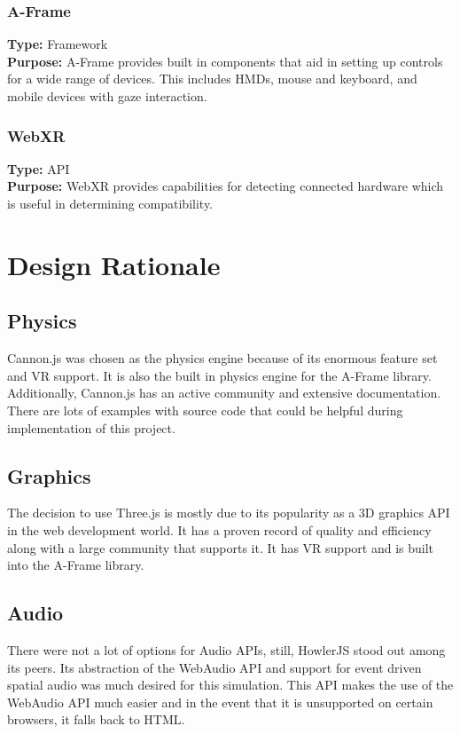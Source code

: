 \documentclass[onecolumn, draftclsnofoot,10pt, compsoc]{IEEEtran}
\begin{document}
\subsubsection{A-Frame}
\textbf{Type:} Framework\\
\textbf{Purpose:} A-Frame provides built in components that aid in setting up controls for a wide range of devices. This includes HMDs, mouse and keyboard, and mobile devices with gaze interaction.

\subsubsection{WebXR}
\textbf{Type:} API\\
\textbf{Purpose:}  WebXR provides capabilities for detecting connected hardware which is useful in determining compatibility.

\section{Design Rationale}

\subsection{Physics}
Cannon.js was chosen as the physics engine because of its enormous feature set and VR support. It is also the built in physics engine for the A-Frame library. Additionally, Cannon.js has an active community and extensive documentation. There are lots of examples with source code that could be helpful during implementation of this project.

\subsection{Graphics}
The decision to use Three.js is mostly due to its popularity as a 3D graphics API in the web development world. It has a proven record of quality and efficiency along with a large community that supports it. It has VR support and is built into the A-Frame library. 

\subsection{Audio}
There were not a lot of options for Audio APIs, still, HowlerJS stood out among its peers. Its abstraction of the WebAudio API and support for event driven spatial audio was much desired for this simulation. This API makes the use of the WebAudio API much easier and in the event that it is unsupported on certain browsers, it falls back to HTML.
\end{document}
